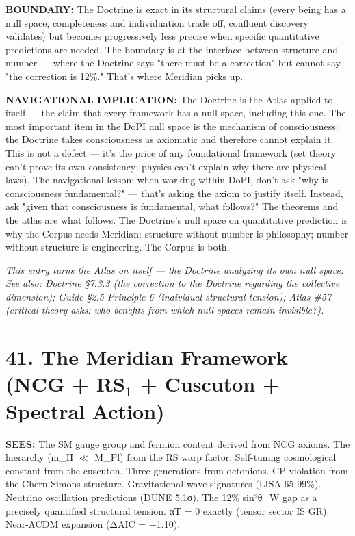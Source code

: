 \textbf{BOUNDARY:} The Doctrine is exact in its structural claims (every being has a null space, completeness and individuation trade off, confluent discovery validates) but becomes progressively less precise when specific quantitative predictions are needed. The boundary is at the interface between structure and number — where the Doctrine says "there must be a correction" but cannot say "the correction is 12\%." That's where Meridian picks up.


\textbf{NAVIGATIONAL IMPLICATION:} The Doctrine is the Atlas applied to itself — the claim that every framework has a null space, including this one. The most important item in the DoPI null space is the mechanism of consciousness: the Doctrine takes consciousness as axiomatic and therefore cannot explain it. This is not a defect — it's the price of any foundational framework (set theory can't prove its own consistency; physics can't explain why there are physical laws). The navigational lesson: when working within DoPI, don't ask "why is consciousness fundamental?" — that's asking the axiom to justify itself. Instead, ask "given that consciousness is fundamental, what follows?" The theorems and the atlas are what follows. The Doctrine's null space on quantitative prediction is why the Corpus needs Meridian: structure without number is philosophy; number without structure is engineering. The Corpus is both.


\textit{This entry turns the Atlas on itself — the Doctrine analyzing its own null space. See also: Doctrine §7.3.3 (the correction to the Doctrine regarding the collective dimension); Guide §2.5 Principle 6 (individual-structural tension); Atlas \#57 (critical theory asks: who benefits from which null spaces remain invisible?).}


\bigskip\noindent\makebox[\textwidth]{\color{rulegray}\rule{5cm}{0.3pt}}\bigskip


\section*{41. The Meridian Framework (NCG + RS$_1$ + Cuscuton + Spectral Action)}


\textbf{SEES:} The SM gauge group and fermion content derived from NCG axioms. The hierarchy (m\_H $\ll$ M\_Pl) from the RS warp factor. Self-tuning cosmological constant from the cuscuton. Three generations from octonions. CP violation from the Chern-Simons structure. Gravitational wave signatures (LISA 65-99\%). Neutrino oscillation predictions (DUNE 5.1σ). The 12\% sin²θ\_W gap as a precisely quantified structural tension. αT = 0 exactly (tensor sector IS GR). Near-ΛCDM expansion (ΔAIC = +1.10).



